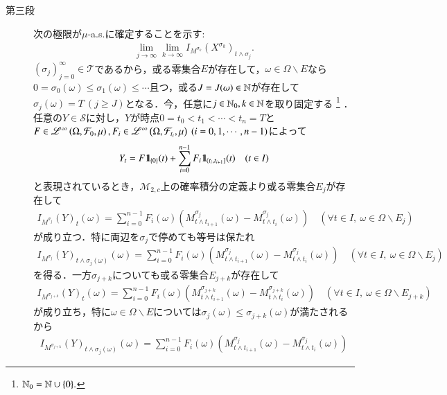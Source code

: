 \begin{prf}
\begin{description}
			\item[第三段]
				次の極限が$\mu$-a.s.に確定することを示す:
				\begin{align}
					\lim_{j \to \infty} \lim_{k \to \infty} I_{M^{\sigma_k}}(X^{\sigma_k})_{t \wedge \sigma_j}.
				\end{align}
				$(\sigma_j)_{j=0}^{\infty} \in \mathcal{T}$であるから，或る零集合$E$が存在して，$\omega \in \Omega \backslash E$なら
				$0 = \sigma_0(\omega) \leq \sigma_1(\omega) \leq \cdots$且つ，或る$J = J(\omega) \in \mathbb{N}$が存在して
				$\sigma_j(\omega) = T\ (j \geq J)$となる．今，任意に$j \in \mathbb{N}_0,k \in \mathbb{N}$を取り固定する
				\footnote{
					$\mathbb{N}_0 = \mathbb{N} \cup \{0\}.$
				}
				．任意の$Y \in \mathcal{S}$に対し，$Y$が時点$0=t_0 < t_1 < \cdots < t_n = T$と
				$F \in \semiLp{\infty}{\Omega,\mathcal{F}_0,\mu},F_i \in \semiLp{\infty}{\Omega,\mathcal{F}_{t_i},\mu}\ (i=0,1,\cdots,n-1)$によって
				\begin{align}
					Y_t = F \mbox{1}\hspace{-0.25em}\mbox{l}_{\{0\}}(t) + \sum_{i=0}^{n-1} F_i \mbox{1}\hspace{-0.25em}\mbox{l}_{\left(t_i,t_{i+1}\right]}(t)
					\quad (t \in I)
				\end{align}
				と表現されているとき，$\mathcal{M}_{2,c}$上の確率積分の定義より或る零集合$E_j$が存在して
				\begin{align}
					I_{M^{\sigma_j}}(Y)_t(\omega) = \sum_{i=0}^{n-1} F_i(\omega) \left( M^{\sigma_j}_{t \wedge t_{i+1}}(\omega) - M^{\sigma_j}_{t \wedge t_i}(\omega) \right)
					\quad (\forall t \in I,\ \omega \in \Omega \backslash E_j)
				\end{align}
				が成り立つ．特に両辺を$\sigma_j$で停めても等号は保たれ
				\begin{align}
					I_{M^{\sigma_j}}(Y)_{t \wedge \sigma_j(\omega)}(\omega) = \sum_{i=0}^{n-1} F_i(\omega) \left( M^{\sigma_j}_{t \wedge t_{i+1}}(\omega) - M^{\sigma_j}_{t \wedge t_i}(\omega) \right)
					\quad (\forall t \in I,\ \omega \in \Omega \backslash E_j)
				\end{align}
				を得る．一方$\sigma_{j+k}$についても或る零集合$E_{j+k}$が存在して
				\begin{align}
					I_{M^{\sigma_{j+k}}}(Y)_t(\omega) = \sum_{i=0}^{n-1} F_i(\omega) \left( M^{\sigma_{j+k}}_{t \wedge t_{i+1}}(\omega) - M^{\sigma_{j+k}}_{t \wedge t_i}(\omega) \right)
					\quad (\forall t \in I,\ \omega \in \Omega \backslash E_{j+k})
				\end{align}
				が成り立ち，特に$\omega \in \Omega \backslash E$については$\sigma_j(\omega) \leq \sigma_{j+k}(\omega)$が満たされるから
				\begin{align}
					I_{M^{\sigma_{j+k}}}(Y)_{t \wedge \sigma_j(\omega)}(\omega) = \sum_{i=0}^{n-1} F_i(\omega) \left( M^{\sigma_j}_{t \wedge t_{i+1}}(\omega) - M^{\sigma_j}_{t \wedge t_i}(\omega) \right)

\end{align}
\end{description}
\end{prf}
